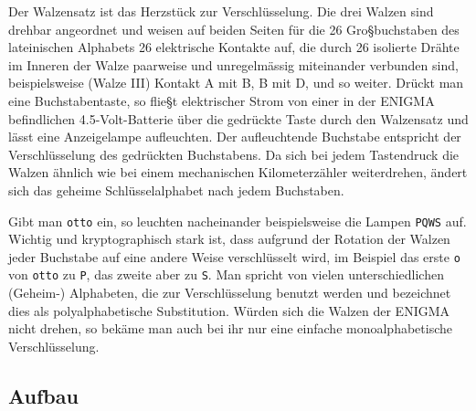 \documentclass[%
11pt,%
twoside,%
titlepage,%
german,%
headsepline%
]{scrartcl}
\begin{document}
Der Walzensatz ist das Herzstück zur Verschlüsselung. Die drei Walzen sind drehbar angeordnet und weisen auf beiden Seiten für die 26 Gro§buchstaben des lateinischen Alphabets 26 elektrische Kontakte auf, die durch 26 isolierte Drähte im Inneren der Walze paarweise und unregelmässig miteinander verbunden sind, beispielsweise (Walze III) Kontakt A mit B, B mit D, und so weiter. Drückt man eine Buchstabentaste, so flie§t elektrischer Strom von einer in der ENIGMA befindlichen 4.5-Volt-Batterie über die gedrückte Taste durch den Walzensatz und lässt eine Anzeigelampe aufleuchten. Der aufleuchtende Buchstabe entspricht der Verschlüsselung des gedrückten Buchstabens. Da sich bei jedem Tastendruck die Walzen ähnlich wie bei einem mechanischen Kilometerzähler weiterdrehen, ändert sich das geheime Schlüsselalphabet nach jedem Buchstaben.

Gibt man \texttt{otto} ein, so leuchten nacheinander beispielsweise die Lampen \texttt{PQWS} auf. Wichtig und kryptographisch stark ist, dass aufgrund der Rotation der Walzen jeder Buchstabe auf eine andere Weise verschlüsselt wird, im Beispiel das erste \texttt{o} von \texttt{otto} zu \texttt{P}, das zweite aber zu \texttt{S}. Man spricht von vielen unterschiedlichen (Geheim-) Alphabeten, die zur Verschlüsselung benutzt werden und bezeichnet dies als polyalphabetische Substitution. Würden sich die Walzen der ENIGMA nicht drehen, so bekäme man auch bei ihr nur eine einfache monoalphabetische Verschlüsselung.

\subsection{Aufbau}
\end{document}
